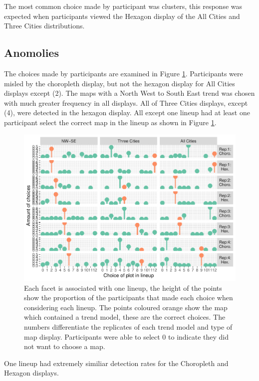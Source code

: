 \documentclass[conference,final,]{IEEEtran}
\makeatletter
\def\maxwidth{\ifdim\Gin@nat@width>\linewidth\linewidth
\else\Gin@nat@width\fi}
\let\Oldincludegraphics\includegraphics
\renewcommand{\includegraphics}[1]{\Oldincludegraphics[width=\maxwidth]{#1}}
\makeatother
\begin{document}
The most common choice made by participant was clusters, this response was expected when participants viewed the Hexagon display of the All Cities and Three Cities distributions.

\hypertarget{anomolies}{%
\subsection{Anomolies}\label{anomolies}}

The choices made by participants are examined in Figure \ref{fig:choices}.
Participants were misled by the choropleth display, but not the hexagon display for All Cities displays except (2). The maps with a North West to South East trend was chosen with much greater frequency in all displays. All of Three Cities displays, except (4), were detected in the hexagon display. All except one lineup had at least one participant select the correct map in the lineup as shown in Figure \ref{fig:choices}.

\begin{figure}
\centering
\includegraphics{paper_files/figure-latex/choices-1.pdf}
\caption{\label{fig:choices}Each facet is associated with one lineup, the height of the points show the proportion of the participants that made each choice when considering each lineup. The points coloured orange show the map which contained a trend model, these are the correct choices. The numbers differentiate the replicates of each trend model and type of map display. Participants were able to select 0 to indicate they did not want to choose a map.}
\end{figure}

One lineup had extremely similiar detection rates for the Choropleth and Hexagon displays.
\end{document}
